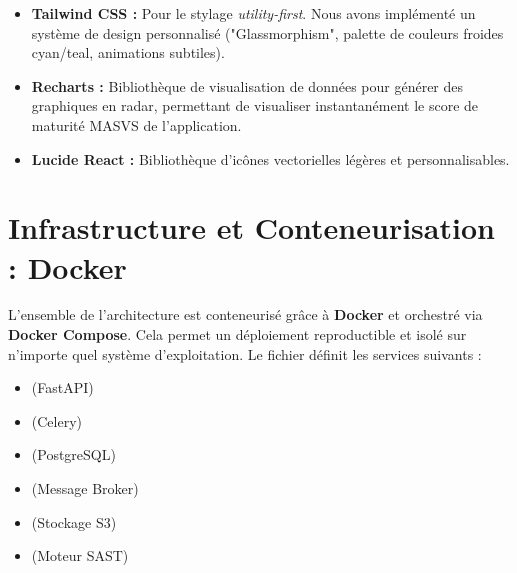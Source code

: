 \begin{tcolorbox}[infobox, title={Stack Frontend}]
\begin{itemize}[label=\textcolor{PrimaryBlue}{\faDesktop}]
    \item \textbf{Tailwind CSS :} Pour le stylage \textit{utility-first}. Nous avons implémenté un système de design personnalisé ("Glassmorphism", palette de couleurs froides cyan/teal, animations subtiles).
    \item \textbf{Recharts :} Bibliothèque de visualisation de données pour générer des graphiques en radar, permettant de visualiser instantanément le score de maturité MASVS de l'application.
    \item \textbf{Lucide React :} Bibliothèque d'icônes vectorielles légères et personnalisables.
\end{itemize}
\end{tcolorbox}

\section{Infrastructure et Conteneurisation : Docker}
L'ensemble de l'architecture est conteneurisé grâce à \textbf{Docker} et orchestré via \textbf{Docker Compose}. Cela permet un déploiement reproductible et isolé sur n'importe quel système d'exploitation. Le fichier  définit les services suivants :
\begin{itemize}
    \item {} (FastAPI)
    \item {} (Celery)
    \item {} (PostgreSQL)
    \item {} (Message Broker)
    \item {} (Stockage S3)
    \item {} (Moteur SAST)
\end{itemize}

\cleardoublepage

